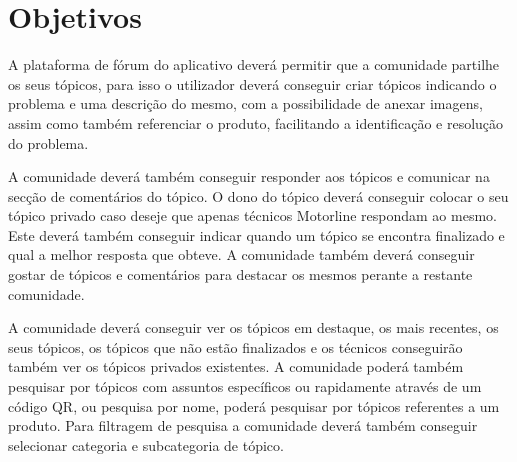  

 
 


\newpage

\section{Objetivos}
A plataforma de fórum do aplicativo deverá permitir que a comunidade partilhe os seus tópicos, para 
isso o utilizador deverá conseguir criar tópicos indicando o problema e uma descrição do mesmo, 
com a possibilidade de anexar imagens, assim como também referenciar 
o produto, facilitando a identificação e resolução do problema.

A comunidade deverá também conseguir responder aos tópicos e comunicar na secção de comentários do tópico. 
O dono do tópico deverá conseguir colocar o seu tópico privado caso deseje que apenas técnicos Motorline 
respondam ao mesmo. Este deverá também conseguir indicar quando um tópico se encontra finalizado e qual a 
melhor resposta que obteve. A comunidade também deverá conseguir gostar de tópicos e comentários para 
destacar os mesmos perante a restante comunidade.

A comunidade deverá conseguir ver os tópicos em destaque, os mais recentes, os seus tópicos, os tópicos 
que não estão finalizados e os técnicos conseguirão também ver os tópicos privados existentes. 
A comunidade poderá também pesquisar por tópicos com assuntos específicos ou rapidamente através de 
um código QR, ou pesquisa por nome, poderá pesquisar por tópicos referentes a um produto. Para filtragem 
de pesquisa a comunidade deverá também conseguir selecionar categoria e subcategoria de tópico.

